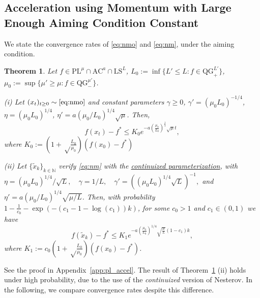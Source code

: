 \documentclass{article}
\def\N{{\mathbb{N}}}
\def\xcont{(x_t)_{t\ge 0}}
\def\xdisctilde{\{\tilde{x}_k \}_{k\in \N}}
\def\pl{{\text{PL}^\mu}}
\newcommand{\bpar}[1]{\left(#1\right)}
\newcommand{\ls}{\text{LS}^{L}}
\newcommand{\ac}{\text{AC}^{a}}
\newcommand{\qgf}[1]{\text{QG}_{+}^{#1}}
\newcommand{\qginff}[1]{\text{QG}_{-}^{#1}}
\theoremstyle{plain}
\newtheorem{theorem}{Theorem}[section]
\theoremstyle{definition}
\theoremstyle{remark}
\begin{document}
\subsection{Acceleration using Momentum with Large Enough Aiming Condition Constant}\label{sec:mom_cv}
We state the convergence rates of \eqref{eq:nmo} and \eqref{eq:nm}, under the aiming condition.
\begin{theorem}\label{thm:pl_accel}
Let $f\in \pl \cap \ac \cap \ls$, $L_0 := \inf \{L'\le L:  f \in \qgf{L'} \}$, $\mu_0 := \sup\{\mu' \ge \mu : f \in \qginff{\mu'}\}$.

(i)  Let $\xcont \sim \eqref{eq:nmo}$ and constant parameters $\gamma\ge 0$,  $\gamma' = (\mu_0 L_0)^{-1/4}$, $\eta = (\mu_0 L_0)^{1/4}$, $\eta' = a\bpar{\mu_0/L_0}^{1/4}\sqrt{\mu}$. Then,
     \begin{equation*}
     f(x_t)-f^\ast \le K_0 e^{-a \bpar{\frac{\mu_0}{L_0}}^{\frac{1}{4}}\sqrt{\mu}t},
 \end{equation*}
 where $K_0 :=  \bpar{1+\sqrt\frac{L_0}{\mu_0}}(f(x_0)-f^\ast)$ 
 
(ii) Let $\xdisctilde$ verify \eqref{eq:nm} with the \hyperlink{cont_param}{continuized parameterization}, with 
$\eta = (\mu_0 L_0)^{1/4}/\sqrt{L},\quad \gamma = 1/L,\quad \gamma' = (( \mu_0 L_0)^{1/4}\sqrt{ L})^{-1}, $ and $\eta' = a\bpar{\mu_0/L_0}^{1/4}\sqrt{\mu/L}$. Then,  
    with probability  $1-\frac{1}{c_0} - \exp(-(c_1-1-\log(c_1))k)$, for some $c_0 > 1$ and $c_1 \in (0,1)$ we have
$$ f(\tilde x_k)-f^\ast \le K_1e^{-a\bpar{\frac{\mu_0}{L_0}}^{1/4}\sqrt{\frac{\mu}{L}}(1-c_1)k}, $$
where $K_1 := c_0 \bpar{1+\sqrt\frac{L_0}{\mu_0}}(f(x_0)-f^\ast)$.
\end{theorem}

See the proof in Appendix~\ref{app:pl_accel}. The result of Theorem~\ref{thm:pl_accel} (ii) holds under high probability, due to the use of the \textit{continuized} version of Nesterov. %
In the following, we compare convergence rates despite this difference.
\end{document}
